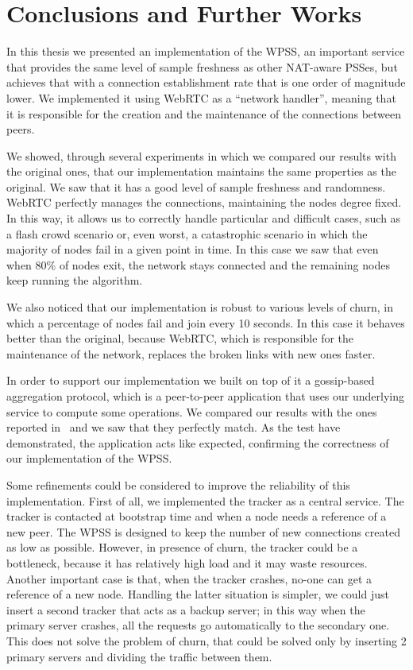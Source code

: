 
\chapter{Conclusions and Further Works}
\label{cha:conclusions}
In this thesis we presented an implementation of the \ac{WPSS}, an important service that provides the same level of sample freshness as other NAT-aware PSSes, but achieves that with a connection establishment rate that is one order of magnitude lower. We implemented it using WebRTC as a ``network handler'', meaning that it is responsible for the creation and the maintenance of the connections between peers.

We showed, through several experiments in which we compared our results with the original ones, that our implementation maintains the same properties as the original. We saw that it has a good level of sample freshness and randomness. WebRTC perfectly manages the connections, maintaining the nodes degree fixed. In this way, it allows us to correctly handle particular and difficult cases, such as a flash crowd scenario or, even worst, a catastrophic scenario in which the majority of nodes fail in a given point in time. In this case we saw that even when 80\% of nodes exit, the network stays connected and the remaining nodes keep running the algorithm. 

We also noticed that our implementation is robust to various levels of churn, in which a percentage of nodes fail and join every 10 seconds. In this case it behaves better than the original, because WebRTC, which is responsible for the maintenance of the network, replaces  the broken links with new ones faster. 

In order to support our implementation we built on top of it a gossip-based aggregation protocol, which is a peer-to-peer application that uses our underlying service to compute some operations. We compared our results with the ones reported in~\cite{aggregation} and we saw that they perfectly match. As the test have demonstrated, the application acts like expected, confirming the correctness of our implementation of the \ac{WPSS}. 

Some refinements could be considered to improve the reliability of this implementation. First of all, we implemented the tracker as a central service. The tracker is contacted at bootstrap time and when a node needs a reference of a new peer. The \ac{WPSS} is designed to keep the number of new connections created as low as possible. However, in presence of churn, the tracker could be a bottleneck, because it has relatively high load and it may waste resources. Another important case is that, when the tracker crashes, no-one can get a reference of a new node. Handling the latter situation is simpler, we could just insert a second tracker that acts as a backup server; in this way when the primary server crashes, all the requests go automatically to the secondary one. This does not solve the problem of churn, that could be solved only by inserting 2 primary servers and dividing the traffic between them. 


